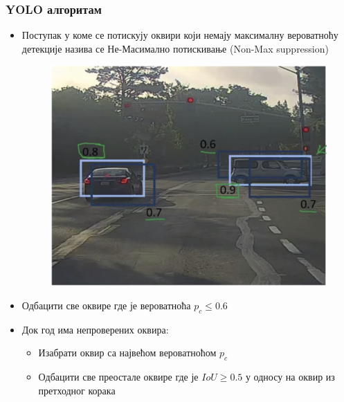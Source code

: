 \begin{frame}
\frametitle{YOLO алгоритам}
\begin{itemize}
 \item Поступак у коме се \alert{потискују} оквири који
 немају максималну вероватноћу детекције назива се
 \alert{Не-Масимално потискивање} (\alert{Non-Max suppression})
 \begin{figure}[H]
  \centering
      \includegraphics[scale=0.24]{slike/ngNonMax1.png}
\end{figure}
  \item Одбацити све оквире где је вероватноћа $p_c \leq 0.6$
  \item Док год има непроверених оквира:
    \begin{itemize}
    \item Изабрати оквир са највећом вероватноћом $p_c$
    \item Одбацити све преостале оквире где је $IoU \geq 0.5$ у односу на
    оквир из претходног корака
    \end{itemize}
  \end{itemize}
\end{frame}

